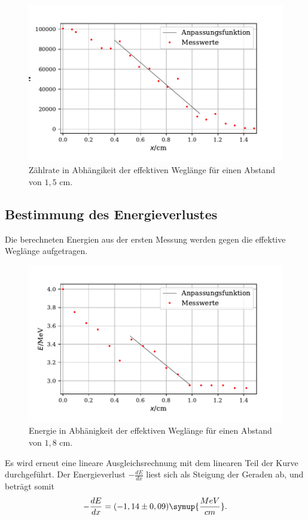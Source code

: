 \begin{figure}[H]
  \centering
  \includegraphics{plot2.pdf}
  \caption{Zählrate in Abhängikeit der effektiven Weglänge für einen Abstand von $1,5$ $\si{\cm}$. }
  \label{fig:plot}
\end{figure}

\subsection{Bestimmung des Energieverlustes}
Die berechneten Energien aus der ersten Messung werden gegen die effektive Weglänge aufgetragen. 
\begin{figure}[H]
  \centering
  \includegraphics{plot3.pdf}
  \caption{Energie in Abhänigkeit der effektiven Weglänge für einen Abstand von $1,8$ $\si{\cm}$. }
  \label{fig:plot}
\end{figure}
\noindent Es wird erneut eine lineare Ausgleichsrechnung mit dem linearen Teil der Kurve durchgeführt. Der Energieverlust $-\frac{dE}{dx}$
liest sich als Steigung der Geraden ab, und beträgt somit
\begin{align*}
-\frac{dE}{dx} = (-1,14 \pm 0,09) \symup{\frac{MeV}{cm}} .
\end{align*}


